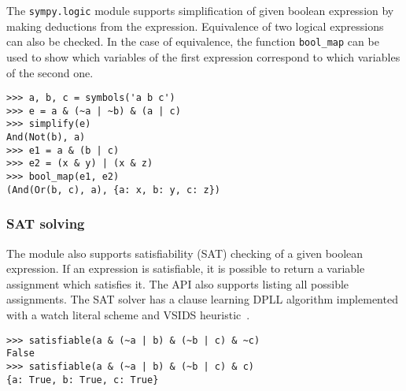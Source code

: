 The \texttt{sympy.logic} module supports simplification of given boolean expression by making
deductions from the expression. Equivalence of two logical expressions can also
be checked. In the case of equivalence, the function \texttt{bool\_map}
can be used to show which variables of the first expression correspond
to which variables of the second one.

\begin{verbatim}
>>> a, b, c = symbols('a b c')
>>> e = a & (~a | ~b) & (a | c)
>>> simplify(e)
And(Not(b), a)
>>> e1 = a & (b | c)
>>> e2 = (x & y) | (x & z)
>>> bool_map(e1, e2)
(And(Or(b, c), a), {a: x, b: y, c: z})
\end{verbatim}

\subsubsection{SAT solving}

The module also supports satisfiability (SAT) checking of a given boolean
expression. If an expression is satisfiable, it is possible to return
a variable assignment which satisfies it. The API also supports
listing all possible assignments.
The SAT solver has a clause learning DPLL algorithm implemented with a watch
literal scheme and VSIDS heuristic~\cite{moskewicz2008method}.

\begin{verbatim}
>>> satisfiable(a & (~a | b) & (~b | c) & ~c)
False
>>> satisfiable(a & (~a | b) & (~b | c) & c)
{a: True, b: True, c: True}
\end{verbatim}
